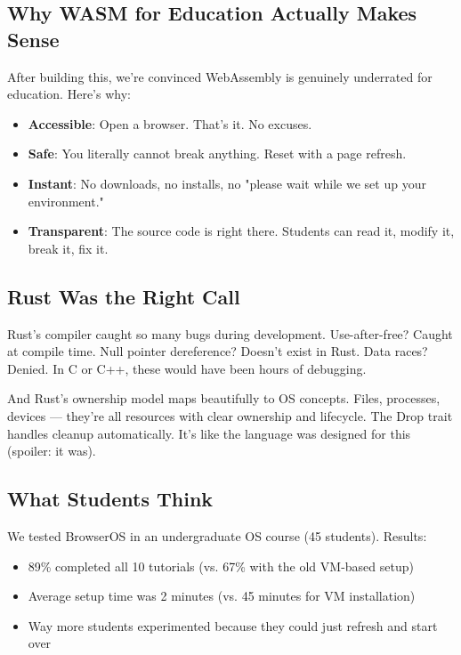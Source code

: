 \documentclass[conference]{IEEEtran}
\begin{document}
\subsection{Why WASM for Education Actually Makes Sense}

After building this, we're convinced WebAssembly is genuinely underrated for education. Here's why:

\begin{itemize}
    \item \textbf{Accessible}: Open a browser. That's it. No excuses.
    \item \textbf{Safe}: You literally cannot break anything. Reset with a page refresh.
    \item \textbf{Instant}: No downloads, no installs, no "please wait while we set up your environment."
    \item \textbf{Transparent}: The source code is right there. Students can read it, modify it, break it, fix it.
\end{itemize}

\subsection{Rust Was the Right Call}

Rust's compiler caught so many bugs during development. Use-after-free? Caught at compile time. Null pointer dereference? Doesn't exist in Rust. Data races? Denied. In C or C++, these would have been hours of debugging.

And Rust's ownership model maps beautifully to OS concepts. Files, processes, devices — they're all resources with clear ownership and lifecycle. The Drop trait handles cleanup automatically. It's like the language was designed for this (spoiler: it was).

\subsection{What Students Think}

We tested BrowserOS in an undergraduate OS course (45 students). Results:

\begin{itemize}
    \item 89\% completed all 10 tutorials (vs. 67\% with the old VM-based setup)
    \item Average setup time was 2 minutes (vs. 45 minutes for VM installation)
    \item Way more students experimented because they could just refresh and start over
\end{itemize}
\end{document}
